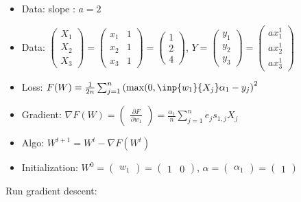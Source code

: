 \begin{itemize}
	\item Data: slope : $a = 2$
	\item Data: $\begin{pmatrix} X_1\\X_2\\X_3\end{pmatrix} = \begin{pmatrix}x_1 & 1 \\ x_2 & 1\\x_3 & 1 \end{pmatrix}=\begin{pmatrix} 1 \\ 2 \\ 4 \end{pmatrix}  $, $Y = \begin{pmatrix}y_1\\y_2\\y_3 \end{pmatrix} = \begin{pmatrix}a x_1^1 \\ a x_2^1 \\ a x_3^1 \end{pmatrix} $
	\item Loss: $F(W) = \frac{1}{2 n} \sum_{j=1}^{n} \left(\max(0, \inp{w_1}{X_j} \alpha_1  - y_j \right)^2$
	\item Gradient: $\nabla F(W) = \begin{pmatrix} \frac{\partial F}{\partial w_1} \end{pmatrix} =
		\frac{\alpha_1}{n} \sum_{j=1}^{n} e_j s_{1, j} X_j$
	\item Algo: $W^{t+1} = W^t - \nabla F(W^t)$
	\item Initialization: $W^0 = \begin{pmatrix} w_1\end{pmatrix} = \begin{pmatrix} 1 & 0\end{pmatrix} $, $\alpha = \begin{pmatrix} \alpha_1 \end{pmatrix}=\begin{pmatrix} 1 \end{pmatrix} $
\end{itemize}

Run gradient descent:

